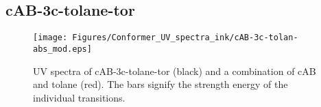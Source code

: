 

\subsection{cAB-3c-tolane-tor}
%
%
%
%
\begin{figure}[H]
    \centering
    \texttt{[image: Figures/Conformer\_UV\_spectra\_ink/cAB-3c-tolan-abs\_mod.eps]}
    \caption{UV spectra of cAB-3c-tolane-tor (black) and a combination of cAB and tolane (red). The bars signify the strength energy of the individual transitions.}
    \label{fig:UV_spec_cAB-for-tAB-3c-tolan}
\end{figure}
%
%
%
